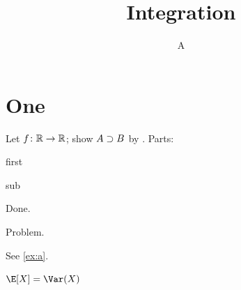 \documentclass[lang=zh, thmnames=native]{akizumi-book}
\title{Integration}\author{A}
\begin{document}
\maketitle
\chapter{One}
\begin{exercise}\label{ex:a}
Let $f\colon\mathbb{R}\to\mathbb{R}$; show $A \supset B$ by \RuleImpI. Parts:
\begin{parts}[itemsep=0pt]
\item first \begin{subparts}\item sub\end{subparts}
\end{parts}
\end{exercise}
\begin{solution} Done. \end{solution}
\begin{example-problem}[title=T] Problem. \end{example-problem}
See \cref{ex:a}.
\begin{theorem} $\E[X]=\Var(X)$ \end{theorem}
\end{document}
